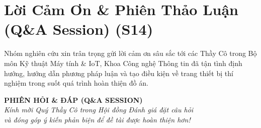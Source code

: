 \documentclass[12pt,a4paper]{article}
\begin{document}
\section{Lời Cảm Ơn \& Phiên Thảo Luận (Q\&A Session) (S14)}

Nhóm nghiên cứu xin trân trọng gửi lời cảm ơn sâu sắc tới các Thầy Cô trong Bộ môn Kỹ thuật Máy tính \& IoT, Khoa Công nghệ Thông tin đã tận tình định hướng, hướng dẫn phương pháp luận và tạo điều kiện về trang thiết bị thí nghiệm trong suốt quá trình hoàn thiện đồ án.

\vspace{0.8cm}
\begin{center}
    \begin{tcolorbox}[colback=boxBgCyan, colframe=iotCyan, width=0.88\textwidth, arc=8pt, boxrule=1.5pt, halign=center]
        \vspace{0.3cm}
        {\Large \textbf{\color{iotDark} PHIÊN HỎI \& ĐÁP (Q\&A SESSION)}}\\[0.3cm]
        {\large \textit{Kính mời Quý Thầy Cô trong Hội đồng Đánh giá đặt câu hỏi\\và đóng góp ý kiến phản biện để đề tài được hoàn thiện hơn!}}\\[0.3cm]
        \vspace{0.2cm}
    \end{tcolorbox}
\end{center}
\end{document}
